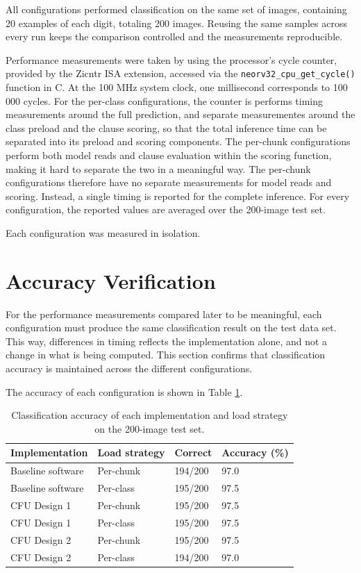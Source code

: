 All configurations performed classification on the same set of images, containing 20 examples of each digit, totaling 200 images. Reusing the same samples across every run keeps the comparison controlled and the measurements reproducible.

Performance measurements were taken by using the processor's cycle counter, provided by the Zicntr ISA extension, accessed via the \texttt{neorv32\_cpu\_get\_cycle()} function in C. At the 100 MHz system clock, one millisecond corresponds to 100\,000 cycles. For the per-class configurations, the counter is performs timing measurements around the full prediction, and separate measurementes around the class preload and the clause scoring, so that the total inference time can be separated into its preload and scoring components. The per-chunk configurations perform both model reads and clause evaluation within the scoring function, making it hard to separate the two in a meaningful way. The per-chunk configurations therefore have no separate measurements for model reads and scoring. Instead, a single timing is reported for the complete inference. For every configuration, the reported values are averaged over the 200-image test set.

Each configuration was measured in isolation.

\section{Accuracy Verification}
\label{sec:results_accuracy}

For the performance measurements compared later to be meaningful, each configuration must produce the same classification result on the test data set. This way, differences in timing reflects the implementation alone, and not a change in what is being computed. This section confirms that classification accuracy is maintained across the different configurations.

The accuracy of each configuration is shown in Table \ref{tab:results_accuracy}.

\begin{table}[H]
\centering
\caption{Classification accuracy of each implementation and load strategy on the 200-image test set.}
\label{tab:results_accuracy}
\begin{tabular}{|l|l|l|l|}
\hline
Implementation & Load strategy & Correct & Accuracy (\%) \\ \hline
Baseline software & Per-chunk & 194/200 & 97.0 \\ \hline
Baseline software & Per-class & 195/200 & 97.5 \\ \hline
CFU Design 1      & Per-chunk & 195/200 & 97.5 \\ \hline
CFU Design 1      & Per-class & 195/200 & 97.5 \\ \hline
CFU Design 2      & Per-chunk & 195/200 & 97.5 \\ \hline
CFU Design 2      & Per-class & 194/200 & 97.0 \\ \hline
\end{tabular}
\end{table}

